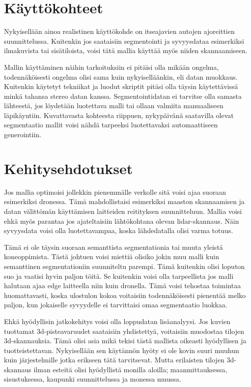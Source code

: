 \section{Käyttökohteet}

Nykyisellään ainoa realistinen käyttökohde on itseajavien autojen ajoreittien suunnittelussa.
Kuitenkin jos saataisiin segmentointi ja syvyysdataa esimerkiksi ilmakuvista tai sisätiloista, voisi tätä mallia käyttää myös niiden skannaamiseen.

Mallin käyttäminen näihin tarkoituksiin ei pitäisi olla mikään ongelma, todennäköisesti ongelma olisi sama kuin nykyiselläänkin, eli datan muokkaus.
Kuitenkin käytetyt tekniikat ja luodut skriptit pitäsi olla täysin käytettävissä minkä tahansa stereo datan kanssa.
Segmentointidatan ei tarvitse olla samasta lähteestä, jos löydetään luotettava malli tai ollaan valmiita manuaaliseen läpikäyntiin.
Kuvattavasta kohteesta riippuen, nykypäivänä saatavilla olevat segmentaatio mallit voisi nähdä tarpeeksi luotettavaksi automaattiseen generointiin.

\section{Kehitysehdotukset}


Jos mallia optimoisi jollekkin pienemmälle verkolle sitä voisi ajaa suoraan esimerkiksi dronessa.
Tämä mahdollistaisi esimerkiksi maaston skannaamisen ja datan välittömän käyttämisen laitteiden reitityksen suunnitteluun.
Mallia voisi ehkä myös parantaa jos ajateltaisiin lähtökohtana olevan lidar-skannaus.
Näin syvyysdata voisi olla luotettavampaa, koska lähdedatalla olisi varma totuus. 

Tämä ei ole täysin suoraan semanttista segmentationia tai muuta yleistä koneoppimista.
Tästä johtuen voisi miettiä olisiko jokin muu malli kuin semanttinen segmentationiin suunniteltu parempi.
Tämä kuitenkin olisi loputon suo ja vaatisi hyvin paljon töitä.
Se kuitenkin voisi olla tarpeellista jos malli halutaan ajaa edge laitteella niin kuin dronella. 
Tämä voisi tehostaa toimintaa huomattavasti, koska ulostulon kokoa voitaisiin todennäköisesti pienentää melko paljon, kun jokaiselle syvyydelle ei tarvittaisi omaa segmentaatio luokkaa.

Ehkä hyödyllisin jatkokehitys voisi olla loppudatan lisäanalyysi.
Jos kuvien tuottamat 3d-pisteavaruudet saataisiin yhdistettyä, voitaisiin muodostaa tilojen 3d-skannauksia.
Tämä olisi asia mikä tekisi tästä mallista oikeasti hyödyllisen ja tuotteistettavan.
Nykyisellään sen käytännön hyöty ei ole kovin suuri muuhun kuin järjestelmille jotka erikseen tätä tarvitsevat.
Mutta erilaisten tilojen 3d-skannaus ilman esteitä olisi hyödyllistä monilla aloilla; maanmittauksessa, sisustuksessa, kaupunki suunnittelussa ja monessa muussa.


